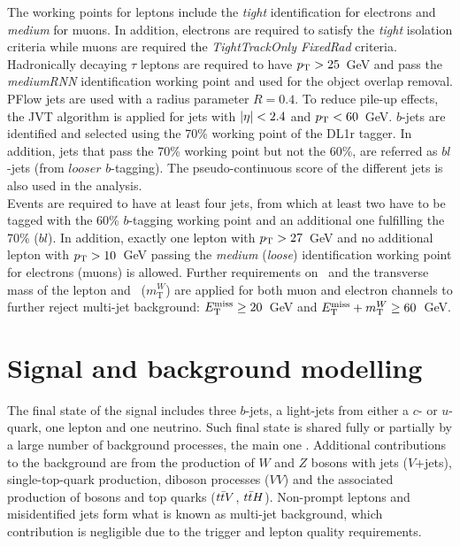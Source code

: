 The working points for leptons include the \textit{tight} identification for electrons and \textit{medium} for muons. In addition, electrons are required to satisfy the \textit{tight} isolation criteria while muons are required the \textit{TightTrackOnly FixedRad} criteria. Hadronically decaying $\tau$ leptons are required to have $p_{\text{T}}>25$~GeV and pass the \textit{mediumRNN} identification working point and used for the object overlap removal.\\

PFlow jets are used with a radius parameter $R=0.4$. To reduce pile-up effects, the JVT algorithm is applied for jets with $\abs{\eta}<2.4$ and $p_{\text{T}}<60$~GeV.%
$b$-jets are identified and selected using the 70\% working point of the DL1r tagger. In addition, jets that pass the 70\% working point but not the 60\%, are referred as $bl$-jets (from $looser$ $b$-tagging). The pseudo-continuous score of the different jets is also used in the analysis.\\

Events are required to have at least four jets, from which at least two have to be tagged with the 60\% $b$-tagging working point and an additional one fulfilling the 70\% ($bl$). In addition, exactly one lepton with $p_{\text{T}}>27$~GeV and no additional lepton with $p_{\text{T}}>10$~GeV passing the \textit{medium} (\textit{loose}) identification working point for electrons (muons) is allowed. Further requirements on \MET\ and the transverse mass of the lepton and \MET\ ($m_{\text{T}}^W$) are applied for both muon and electron channels to further reject multi-jet background: $E_{\text{T}}^{\text{miss}}\geq20$~GeV and $E_{\text{T}}^{\text{miss}}+m_{\text{T}}^W\geq60$~GeV.\\

\section{Signal and background modelling}

The final state of the signal includes three $b$-jets, a light-jets from either a $c$- or $u$-quark, one lepton and one neutrino. Such final state is shared fully or partially by a large number of background processes, the main one \ttjets. Additional contributions to the background are from the production of $W$ and $Z$ bosons with jets ($V$+jets), single-top-quark production, diboson processes ($VV$) and the associated production of bosons and top quarks ($t\bar{t} V$, $t\bar{t} H$). Non-prompt leptons and misidentified jets form what is known as multi-jet background, which contribution is negligible due to the trigger and lepton quality requirements.\\

